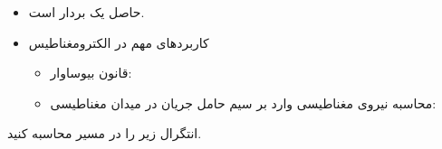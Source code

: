 \begin{ELjoin}

\begin{itemize}
\tightlist
\item
  حاصل یک بردار است.
\item
  کاربردهای مهم در الکترومغناطیس

  \begin{itemize}
  \item
    قانون بیوساوار:
  \item
    محاسبه نیروی مغناطیسی وارد بر سیم حامل جریان در میدان مغناطیسی:
  \end{itemize}
\end{itemize}


\begin{ELexample}{}

انتگرال زیر را در مسیر  محاسبه کنید.



\begin{ELsolution}


\end{ELsolution}

\end{ELexample}

\end{ELjoin}

\ELhold


